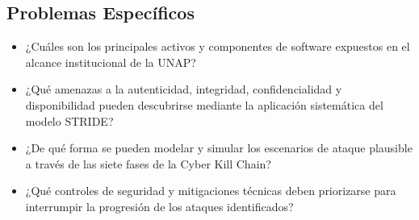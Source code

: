 \subsection{Problemas Específicos}
\begin{itemize}
    \item ¿Cuáles son los principales activos y componentes de software expuestos en el alcance institucional de la UNAP?
    \item ¿Qué amenazas a la autenticidad, integridad, confidencialidad y disponibilidad pueden descubrirse mediante la aplicación sistemática del modelo STRIDE?
    \item ¿De qué forma se pueden modelar y simular los escenarios de ataque plausible a través de las siete fases de la Cyber Kill Chain?
    \item ¿Qué controles de seguridad y mitigaciones técnicas deben priorizarse para interrumpir la progresión de los ataques identificados?
\end{itemize}
